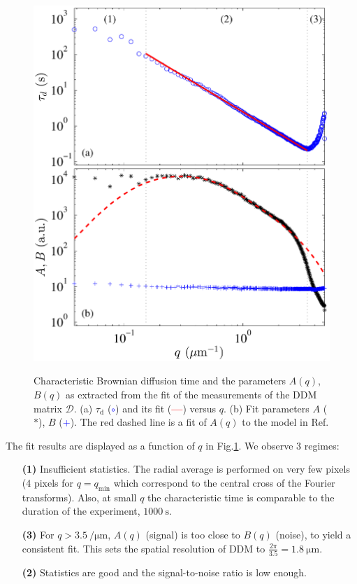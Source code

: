\documentclass[prb,reprint,amsmath,amssymb]{revtex4-1}
\newcommand{\tg}[1]{{\color{magenta}#1}} %
\begin{document}
\begin{figure}
	\includegraphics[width=\linewidth]{DiffusionColloids.pdf}\\
	\caption{Characteristic Brownian diffusion time and the parameters $A(q)$, $B(q)$ \tg{as extracted from the fit of the measurements of the DDM matrix $\mathcal{D}$. (a) $\tau_\text{d}$ (\textcolor{blue}{$\circ$}) and its fit (\textcolor{red}{\textbf{---}}) versus $q$. (b) Fit parameters $A$ ($\ast$), $B$ (\textcolor{blue}{+}). The red dashed line is a fit of $A(q)$ to the model in Ref\citep{3_DDM3D}.} }
	\label{fig:FitDiffColl}
\end{figure}

The fit results are displayed  as a function of $q$ in Fig.\ref{fig:FitDiffColl}. We observe 3 regimes:
\begin{itemize}
\item[\textbf{(1)}] Insufficient statistics. The radial average is performed on very few pixels (4 pixels for $q = q_\text{min}$ which correspond to the central cross of the Fourier transforms).  Also, at small $q$ the characteristic time is comparable to the duration of the experiment, $\SI{1000}{\second}$.
\item[\textbf{(3)}] For  $q>\SI{3.5}{\per\micro\meter}$, $A(q)$ (signal) is too close to $B(q)$ (noise), to yield a consistent fit. This sets the spatial resolution of DDM to  $\frac{2\pi}{3.5} = \SI{1.8}{\micro\meter}$.
\item[\textbf{(2)}] Statistics are good and the signal-to-noise ratio is low enough.
\end{itemize}
\end{document}
